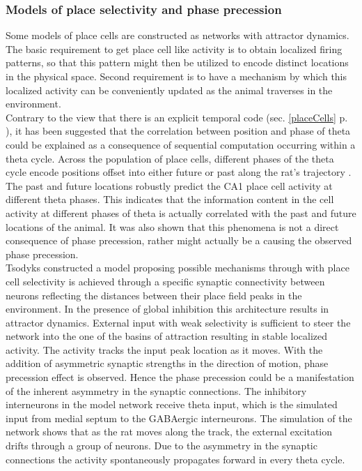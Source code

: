 \subsubsection{Models of place selectivity and phase precession}
Some models of place cells are constructed as networks with attractor dynamics. The basic requirement to get place cell like activity is to obtain localized firing patterns, so that this pattern might then be utilized to encode distinct locations in the physical space. Second requirement is to have a mechanism by which this localized activity can be conveniently updated as the animal traverses in the environment.  \\

Contrary to the view that there is an explicit temporal code (sec. \ref{placeCells} p. \pageref{placeCells}), it has been suggested that the correlation between position and phase of theta could be explained as a consequence of sequential computation occurring within a theta cycle. Across the population of place cells, different phases of the theta cycle encode positions offset into either future or past along the rat's trajectory \cite{Itskov2008}. The past and future locations robustly predict the CA1 place cell activity at different theta phases. This indicates that the information content in the cell activity at different phases of theta is actually correlated with the past and future locations of the animal. It was also shown that this phenomena is not a direct consequence of phase precession, rather might actually be a causing the observed phase precession. \\

Tsodyks \cite{Tsodyks1996} constructed a model proposing possible mechanisms through with place cell selectivity is achieved through a specific synaptic connectivity between neurons reflecting the distances between their place field peaks in the environment. In the presence of global inhibition this architecture results in attractor dynamics. External input with weak selectivity is sufficient to steer the network into the one of the basins of attraction resulting in stable localized activity. The activity tracks the input peak location as it moves. With the addition of asymmetric synaptic strengths in the direction of motion, phase precession effect is observed. Hence the phase precession could be a manifestation of the inherent asymmetry in the synaptic connections. The inhibitory interneurons in the model network receive theta input, which is the simulated input from medial septum to the GABAergic interneurons. The simulation of the network shows that as the rat moves along the track, the external excitation drifts through a group of neurons. Due to the asymmetry in the synaptic connections the activity spontaneously propagates forward in every theta cycle. \\  

